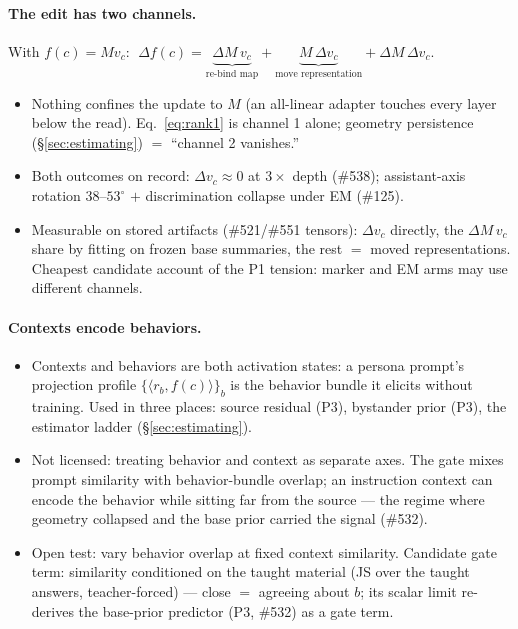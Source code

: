 \documentclass[11pt]{article}
\newcommand{\vc}{v_c}
\begin{document}
\paragraph{The edit has two channels.} With $f(c) = M\vc$: $\;\Delta f(c) = \underbrace{\Delta M\,\vc}_{\text{re-bind map}} + \underbrace{M\,\Delta\vc}_{\text{move representation}} + \Delta M\,\Delta\vc$.
\begin{itemize}
\item Nothing confines the update to $M$ (an all-linear adapter touches every layer below the read). Eq.~\eqref{eq:rank1} is channel 1 alone; geometry persistence (\S\ref{sec:estimating}) $=$ ``channel 2 vanishes.''
\item Both outcomes on record: $\Delta\vc \approx 0$ at $3\times$ depth (\#538); assistant-axis rotation $38$--$53^{\circ}$ $+$ discrimination collapse under EM (\#125).
\item Measurable on stored artifacts (\#521/\#551 tensors): $\Delta\vc$ directly, the $\Delta M\,\vc$ share by fitting on frozen base summaries, the rest $=$ moved representations. Cheapest candidate account of the P1 tension: marker and EM arms may use different channels.
\end{itemize}

\paragraph{Contexts encode behaviors.}
\begin{itemize}
\item Contexts and behaviors are both activation states: a persona prompt's projection profile $\{\langle r_b, f(c)\rangle\}_b$ is the behavior bundle it elicits without training. Used in three places: source residual (P3), bystander prior (P3), the estimator ladder (\S\ref{sec:estimating}).
\item Not licensed: treating behavior and context as separate axes. The gate mixes prompt similarity with behavior-bundle overlap; an instruction context can encode the behavior while sitting far from the source --- the regime where geometry collapsed and the base prior carried the signal (\#532).
\item Open test: vary behavior overlap at fixed context similarity. Candidate gate term: similarity conditioned on the taught material (JS over the taught answers, teacher-forced) --- close $=$ agreeing about $b$; its scalar limit re-derives the base-prior predictor (P3, \#532) as a gate term.
\end{itemize}
\end{document}
